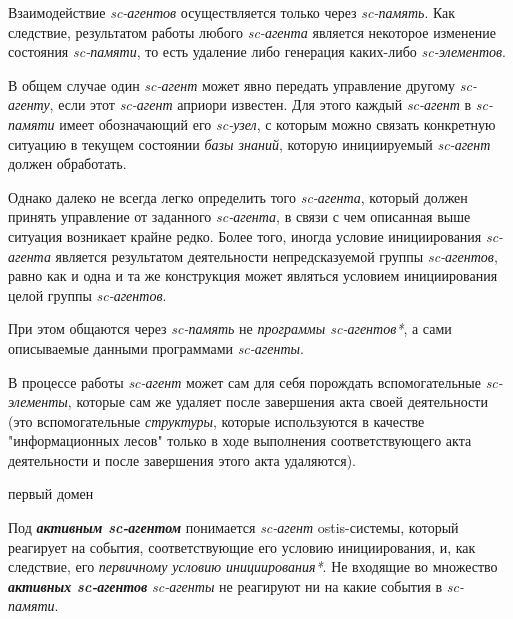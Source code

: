 Взаимодействие \textit{sc-агентов} осуществляется только через \textit{sc-память}. Как следствие, результатом работы любого \textit{sc-агента} является некоторое изменение состояния \textit{sc-памяти}, то есть удаление либо генерация каких-либо \textit{sc-элементов}.
	
В общем случае один \textit{sc-агент} может явно передать управление другому \textit{sc-агенту}, если этот \textit{sc-агент} априори известен. Для этого каждый \textit{sc-агент} в \textit{sc-памяти} имеет обозначающий его \textit{sc-узел}, с которым можно связать конкретную ситуацию в текущем состоянии \textit{базы знаний}, которую инициируемый \textit{sc-агент} должен обработать.
	
Однако далеко не всегда легко определить того \textit{sc-агента}, который должен принять управление от заданного \textit{sc-агента}, в связи с чем описанная выше ситуация возникает крайне редко. Более того, иногда условие инициирования \textit{sc-агента} является результатом деятельности непредсказуемой группы \textit{sc-агентов}, равно как и одна и та же конструкция может являться условием инициирования целой группы \textit{sc-агентов}.

При этом общаются через \textit{sc-память} не \textit{программы sc-агентов*}, а сами описываемые данными программами \textit{sc-агенты}.

В процессе работы \textit{sc-агент} может сам для себя порождать вспомогательные \textit{sc-элементы}, которые сам же удаляет после завершения акта своей деятельности (это вспомогательные \textit{структуры}, которые используются в качестве "информационных лесов"{} только в ходе выполнения соответствующего акта деятельности и после завершения этого акта удаляются).

\begin{SCn}
\begin{scnrelfromlist}{первый домен}
\end{scnrelfromlist}
\end{SCn}

Под \textbf{\textit{активным sc-агентом}} понимается \textit{sc-агент} ostis-системы, который реагирует на события, соответствующие его условию инициирования, и, как следствие, его \textit{первичному условию инициирования*}. Не входящие во множество \textbf{\textit{активных sc-агентов}} \textit{sc-агенты} не реагируют ни на какие события в \textit{sc-памяти}.

